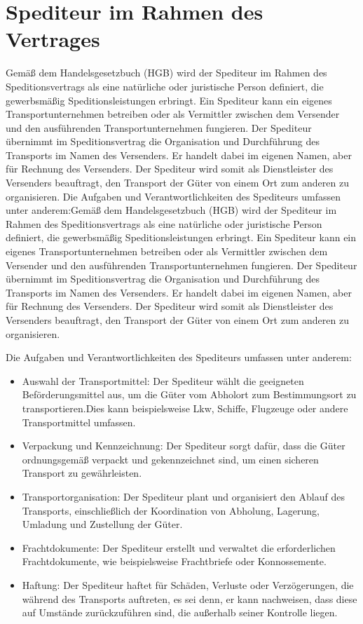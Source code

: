     \section{Spediteur im Rahmen des Vertrages}
    Gemäß dem Handelsgesetzbuch (HGB) wird der Spediteur im Rahmen des Speditionsvertrags als eine natürliche oder juristische Person definiert, die gewerbsmäßig Speditionsleistungen erbringt. Ein Spediteur kann ein eigenes Transportunternehmen betreiben oder als Vermittler zwischen dem Versender und den ausführenden Transportunternehmen fungieren.
    Der Spediteur übernimmt im Speditionsvertrag die Organisation und Durchführung des Transports im Namen des Versenders.
    Er handelt dabei im eigenen Namen, aber für Rechnung des Versenders.
    Der Spediteur wird somit als Dienstleister des Versenders beauftragt, den Transport der Güter von einem Ort zum anderen zu organisieren.
    Die Aufgaben und Verantwortlichkeiten des Spediteurs umfassen unter anderem:Gemäß dem Handelsgesetzbuch (HGB) wird der Spediteur im Rahmen des Speditionsvertrags als eine natürliche oder juristische Person definiert, die gewerbsmäßig Speditionsleistungen erbringt.
    Ein Spediteur kann ein eigenes Transportunternehmen betreiben oder als Vermittler zwischen dem Versender und den ausführenden Transportunternehmen fungieren.
    Der Spediteur übernimmt im Speditionsvertrag die Organisation und Durchführung des Transports im Namen des Versenders. Er handelt dabei im eigenen Namen, aber für Rechnung des Versenders.
    Der Spediteur wird somit als Dienstleister des Versenders beauftragt, den Transport der Güter von einem Ort zum anderen zu organisieren.

    Die Aufgaben und Verantwortlichkeiten des Spediteurs umfassen unter anderem:\nl
    \begin{itemize}
        \item Auswahl der Transportmittel:  Der Spediteur wählt die geeigneten Beförderungsmittel aus, um die Güter vom Abholort zum Bestimmungsort zu transportieren.Dies kann beispielsweise Lkw, Schiffe, Flugzeuge oder andere Transportmittel umfassen.
        \item Verpackung und Kennzeichnung: Der Spediteur sorgt dafür, dass die Güter ordnungsgemäß verpackt und gekennzeichnet sind, um einen sicheren Transport zu gewährleisten.
        \item Transportorganisation: Der Spediteur plant und organisiert den Ablauf des Transports, einschließlich der Koordination von Abholung, Lagerung, Umladung und Zustellung der Güter.
        \item Frachtdokumente: Der Spediteur erstellt und verwaltet die erforderlichen Frachtdokumente, wie beispielsweise Frachtbriefe oder Konnossemente.
        \item Haftung: Der Spediteur haftet für Schäden, Verluste oder Verzögerungen, die während des Transports auftreten, es sei denn, er kann nachweisen, dass diese auf Umstände zurückzuführen sind, die außerhalb seiner Kontrolle liegen.
    \end{itemize}

